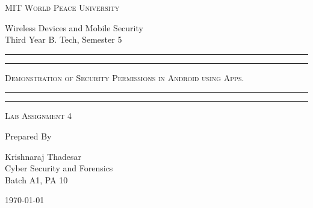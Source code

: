 \documentclass[11pt]{article}
\begin{document}
\begin{titlepage}
    \centering


    \huge\textsc{
        MIT World Peace University
    }\\

    \vspace{0.75\baselineskip} %

    \LARGE{
        Wireless Devices and Mobile Security\\
        Third Year B. Tech, Semester 5
    }

    \vfill %


    \rule{\textwidth}{1.6pt}\vspace*{-\baselineskip}\vspace*{2pt}
    \rule{\textwidth}{0.6pt}
    \vspace{0.75\baselineskip} %



    \huge{\textsc{
            Demonstration of Security Permissions in Android using Apps.
        }} \\



    \vspace{0.5\baselineskip} %
    \rule{\textwidth}{0.6pt}\vspace*{-\baselineskip}\vspace*{2.8pt}
    \rule{\textwidth}{1.6pt}

    \vspace{1\baselineskip} %


    \LARGE\textsc{
        Lab Assignment 4
    } %
    \vfill


    Prepared By
    \vspace{0.5\baselineskip} %

    \Large{
        Krishnaraj Thadesar \\
        Cyber Security and Forensics\\
        Batch A1, PA 10
    }


    \vspace{0.5\baselineskip} %
    \today

\end{titlepage}
\end{document}
